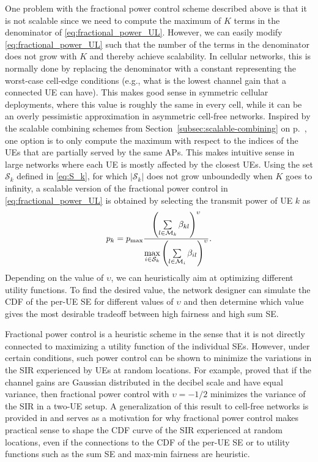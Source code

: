 \enlargethispage{\baselineskip}

One problem with the fractional power control scheme described above is that it is not scalable since we need to compute the maximum of $K$ terms in the denominator of \eqref{eq:fractional_power_UL}. 
However, we can easily modify \eqref{eq:fractional_power_UL} such that the number of the terms in the denominator does not grow with $K$ and thereby achieve scalability.
In cellular networks, this is normally done by replacing the denominator with a constant representing the worst-case cell-edge conditions (e.g., what is the lowest channel gain that a connected UE can have). This makes good sense in symmetric cellular deployments, where this value is roughly the same in every cell, while it can be an overly pessimistic approximation in asymmetric cell-free networks.
 Inspired by the scalable combining schemes from Section~\ref{subsec:scalable-combining} on p.~\pageref{subsec:scalable-combining}, one option is to only compute the maximum with respect to the indices of the UEs that are partially served by the same APs. This makes intuitive sense in large networks where each UE is mostly affected by the closest UEs.
Using the set $\mathcal{S}_k$ defined in \eqref{eq:S_k}, for which $|\mathcal{S}_k|$ does not grow unboundedly when $K$ goes to infinity, a scalable version of the fractional power control in \eqref{eq:fractional_power_UL} is obtained by selecting the transmit power of UE $k$ as
\begin{align}\label{eq:fractional_power_UL-scalable}
p_k= p_{\textrm{max}}\frac{\left(\sum\limits_{l\in\mathcal{M}_k}\beta_{kl}\right)^{\upsilon}}{\underset{i\in\mathcal{S}_k}{\max}\left(\sum\limits_{l\in\mathcal{M}_i}\beta_{il}\right)^{\upsilon}}.
\end{align}
Depending on the value of $\upsilon$, we can heuristically aim at optimizing different utility functions. To find the desired value, the network designer can simulate the CDF of the per-UE SE for different values of $\upsilon$ and then determine which value gives the most desirable tradeoff between high fairness and high sum SE.

\begin{remark}
Fractional power control is a heuristic scheme in the sense that it is not directly connected to maximizing a utility function of the individual SEs. However, under certain conditions, such power control can be shown to minimize the variations in the \gls{SIR} experienced by UEs at random locations. For example, \cite{Whitehead1993a} proved that if the channel gains are Gaussian distributed in the decibel scale and have equal variance, then fractional power control with $\upsilon=-1/2$  minimizes the variance of the SIR in a two-UE setup. A generalization of this result to cell-free networks is provided in \cite{Nikbakht2020a} and serves as a motivation for why fractional power control makes practical sense to shape the CDF curve of the SIR experienced at random locations, even if the connections to the CDF of the per-UE SE or to utility functions such as the sum SE and max-min fairness are heuristic.
\end{remark}


